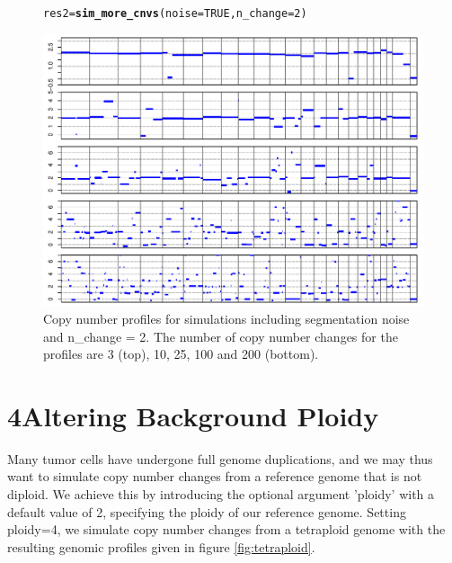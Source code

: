 \documentclass[12pt]{article}\usepackage[]{graphicx}\usepackage[]{color}
\makeatletter
\newcommand{\hlnum}[1]{\textcolor[rgb]{0.686,0.059,0.569}{#1}}%
\newcommand{\hlstd}[1]{\textcolor[rgb]{0.345,0.345,0.345}{#1}}%
\newcommand{\hlkwb}[1]{\textcolor[rgb]{0.69,0.353,0.396}{#1}}%
\newcommand{\hlkwc}[1]{\textcolor[rgb]{0.333,0.667,0.333}{#1}}%
\newcommand{\hlkwd}[1]{\textcolor[rgb]{0.737,0.353,0.396}{\textbf{#1}}}%
\newenvironment{kframe}{%
 \def\at@end@of@kframe{}%
 \ifinner\ifhmode%
  \def\at@end@of@kframe{\end{minipage}}%
  \begin{minipage}{\columnwidth}%
 \fi\fi%
 \def\FrameCommand##1{\hskip\@totalleftmargin \hskip-\fboxsep
 \colorbox{shadecolor}{##1}\hskip-\fboxsep
     \hskip-\linewidth \hskip-\@totalleftmargin \hskip\columnwidth}%
 \MakeFramed {\advance\hsize-\width
   \@totalleftmargin\z@ \linewidth\hsize
   \@setminipage}}%
 {\par\unskip\endMakeFramed%
 \at@end@of@kframe}
\newenvironment{knitrout}{}{} %
\makeatother
\begin{document}
\begin{figure}[h!]
  \centering
\begin{knitrout}
\color{fgcolor}\begin{kframe}
\begin{alltt}
\hlstd{res2} \hlkwb{=} \hlkwd{sim_more_cnvs}\hlstd{(} \hlkwc{noise}\hlstd{=}\hlnum{TRUE}\hlstd{,} \hlkwc{n_change}\hlstd{=}\hlnum{2}\hlstd{)}
\end{alltt}
\end{kframe}
\includegraphics[width=.95\linewidth]{figure/unnamed-chunk-6-1} 

\end{knitrout}
\caption{Copy number profiles for simulations including segmentation noise and n\_change = 2. The number of copy number changes for the profiles are 3 (top), 10, 25, 100 and 200 (bottom).}
\label{fig:noise}
\end{figure}

\newpage

\section*{4\quad Altering Background Ploidy}

Many tumor cells have undergone full genome duplications, and we may thus want to simulate copy number changes from a reference genome that is not diploid. We achieve this by introducing the optional argument 'ploidy' with a default value of 2, specifying the ploidy of our reference genome. Setting ploidy=4, we simulate copy number changes from a tetraploid genome with the resulting genomic profiles given in figure \ref{fig:tetraploid}.
\end{document}
